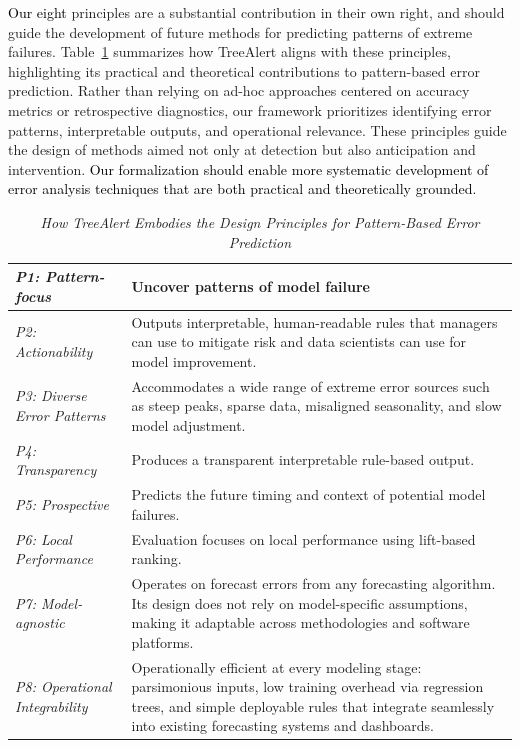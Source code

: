 \documentclass[]{interact}
\newcommand{\galit}[1]{\textcolor{black}{#1}}
\theoremstyle{definition}
\begin{document}
\galit{Our eight} %
principles %
are a substantial contribution in their own right, and should guide the development of future methods for predicting patterns of extreme failures. Table~\ref{tab:design} summarizes how TreeAlert aligns with these principles, highlighting its practical and theoretical contributions to pattern-based error prediction. Rather than relying on ad-hoc approaches centered on accuracy metrics or retrospective diagnostics, our framework prioritizes identifying error patterns, interpretable outputs, and operational relevance. These principles guide the design of methods aimed not only at detection but also anticipation and intervention. \galit{Our  formalization %
should enable more systematic development of error analysis techniques that are both practical and theoretically grounded.}

\begin{table}
\centering
\caption{\textit{How TreeAlert Embodies the Design Principles for Pattern-Based Error Prediction}}
\small
\begin{tabular}{|m{3cm}|m{12.2cm}|}
\hline
\centering\textit{P1: Pattern-focus} &
Uncover patterns of model failure \\
\hline
\centering\textit{P2: Actionability} &
Outputs interpretable, human-readable rules that managers can use to mitigate risk and data scientists can use for model improvement. \\
\hline
\centering\textit{P3: Diverse Error Patterns} &
Accommodates a wide range of extreme error sources such as steep peaks, sparse data, misaligned seasonality, and slow model adjustment. \\
\hline
\centering\textit{P4: Transparency} &
Produces a transparent interpretable rule-based output. \\
\hline
\centering\textit{P5: Prospective} &
Predicts the future timing and context of potential model failures. \\
\hline
\centering\textit{P6: Local Performance} &
Evaluation focuses on local performance using lift-based ranking. \\
\hline
\centering\textit{P7: Model-agnostic} &
Operates on forecast errors from any forecasting algorithm. Its design does not rely on model-specific assumptions, making it adaptable across methodologies and software platforms. \\
\hline
\centering\textit{P8: Operational Integrability} &
Operationally efficient at every modeling stage: parsimonious inputs, low training overhead via regression trees, and simple deployable rules that integrate seamlessly into existing forecasting systems and dashboards. \\
\hline
\end{tabular}
\label{tab:design}
\end{table}
\end{document}
